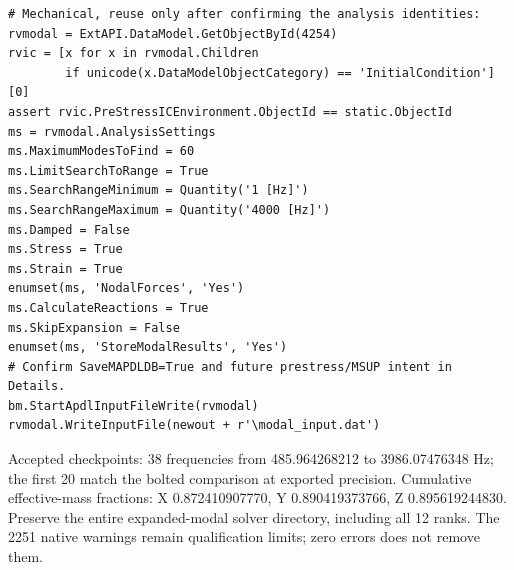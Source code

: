 \documentclass[10pt,a4paper]{article}
\begin{document}
\begin{lstlisting}
# Mechanical, reuse only after confirming the analysis identities:
rvmodal = ExtAPI.DataModel.GetObjectById(4254)
rvic = [x for x in rvmodal.Children
        if unicode(x.DataModelObjectCategory) == 'InitialCondition'][0]
assert rvic.PreStressICEnvironment.ObjectId == static.ObjectId
ms = rvmodal.AnalysisSettings
ms.MaximumModesToFind = 60
ms.LimitSearchToRange = True
ms.SearchRangeMinimum = Quantity('1 [Hz]')
ms.SearchRangeMaximum = Quantity('4000 [Hz]')
ms.Damped = False
ms.Stress = True
ms.Strain = True
enumset(ms, 'NodalForces', 'Yes')
ms.CalculateReactions = True
ms.SkipExpansion = False
enumset(ms, 'StoreModalResults', 'Yes')
# Confirm SaveMAPDLDB=True and future prestress/MSUP intent in Details.
bm.StartApdlInputFileWrite(rvmodal)
rvmodal.WriteInputFile(newout + r'\modal_input.dat')
\end{lstlisting}

Accepted checkpoints: 38 frequencies from 485.964268212 to 3986.07476348 Hz; the first 20 match the bolted comparison at exported precision. Cumulative effective-mass fractions: X 0.872410907770, Y 0.890419373766, Z 0.895619244830. Preserve the entire expanded-modal solver directory, including all 12 ranks. The 2251 native warnings remain qualification limits; zero errors does not remove them.
\end{document}
